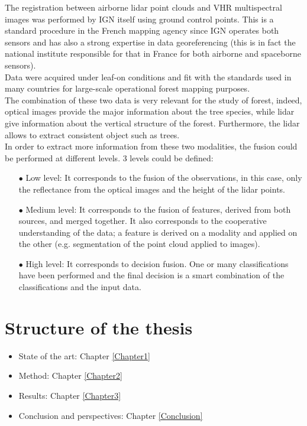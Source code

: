 The registration between airborne lidar point clouds and VHR multispectral images was performed by IGN itself using ground control points. This is a standard procedure in the French mapping agency since IGN operates both sensors and has also a strong expertise in data georeferencing (this is in fact the national institute responsible for that in France for both airborne and spaceborne sensors). \\
Data were acquired under leaf-on conditions and fit with the standards used in many countries for large-scale operational forest mapping purposes. \\

The combination of these two data is very relevant for the study of forest, indeed, optical images provide the major information about the tree species, while lidar give information about the vertical structure of the forest. Furthermore, the lidar allows to extract consistent object such as trees. \\

In order to extract more information from these two modalities, the fusion could be performed at different levels. 3 levels could be defined:
\begin{itemize}
\item[$\bullet$] Low level: It corresponds to the fusion of the observations, in this case, only the reflectance from the optical images and the height of the lidar points.
\item[$\bullet$] Medium level: It corresponds to the fusion of features, derived from both sources, and merged together. It also corresponds to the cooperative understanding of the data; a feature is derived on a modality and applied on the other (e.g. segmentation of the point cloud applied to images).
\item[$\bullet$] High level: It corresponds to decision fusion. One or many classifications have been performed and the final decision is a smart combination of the classifications and the input data.
\end{itemize}

\section{Structure of the thesis}

\begin{itemize}
\item State of the art: Chapter \ref{Chapter1}
\item Method: Chapter \ref{Chapter2}
\item Results: Chapter \ref{Chapter3}
\item Conclusion and perspectives: Chapter \ref{Conclusion}
\end{itemize}

\stopcontents[chapters]
